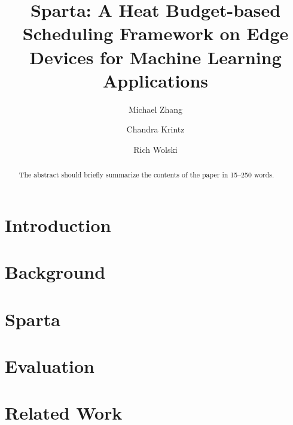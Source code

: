 \documentclass[runningheads]{llncs}
\begin{document}
%

\title{Sparta: A Heat Budget-based Scheduling Framework on Edge Devices for Machine Learning Applications}

%
%


\author{Michael Zhang \and
Chandra Krintz \and
Rich Wolski}


%
\maketitle              %
%


\begin{abstract}
The abstract should briefly summarize the contents of the paper in
15--250 words.

\end{abstract}
%
%
%


\section{Introduction}
\label{spt:intro}


\section{Background}
\label{spt:background}


\section{Sparta}
\label{spt:Sparta}


\section{Evaluation}
\label{spt:eval}


\section{Related Work}
\label{spt:relate_work}

\end{document}
